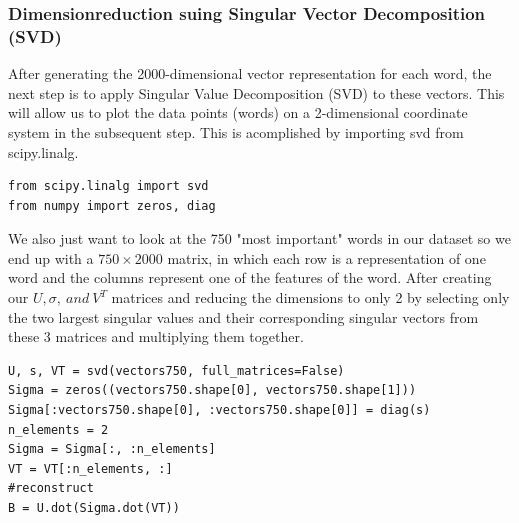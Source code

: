 \documentclass[11pt,a4paper]{article}
\begin{document}
\subsubsection{Dimensionreduction suing Singular Vector Decomposition (SVD)}
After generating the 2000-dimensional vector representation for each word, the next step is to apply Singular Value Decomposition (SVD) to these vectors. This will allow us to plot the data points (words) on a 2-dimensional coordinate system in the subsequent step. This is acomplished by importing svd from scipy.linalg.
\begin{lstlisting}
from scipy.linalg import svd
from numpy import zeros, diag
\end{lstlisting}
We also just want to look at the 750 "most important" words in our dataset so we end up with a \(750 \times 2000\) matrix, in which each row is a representation of one word and the columns represent one of the features of the word. After creating our \(U, \sigma,~and~V^T \) matrices and reducing the dimensions to only 2 by selecting only the two largest singular values and their corresponding singular vectors from these 3 matrices and multiplying them together.
\begin{lstlisting}
U, s, VT = svd(vectors750, full_matrices=False)
Sigma = zeros((vectors750.shape[0], vectors750.shape[1]))
Sigma[:vectors750.shape[0], :vectors750.shape[0]] = diag(s)
n_elements = 2
Sigma = Sigma[:, :n_elements]
VT = VT[:n_elements, :]
#reconstruct
B = U.dot(Sigma.dot(VT))
\end{lstlisting}
\end{document}
